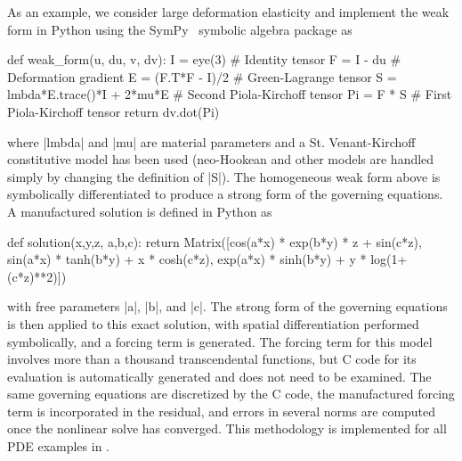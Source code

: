 As an example, we consider large deformation elasticity and implement the weak form in Python using the SymPy~\citep{sympy-web-page} symbolic algebra package as
\begin{pythoncode}
  def weak_form(u, du, v, dv):
    I = eye(3)                      # Identity tensor
    F = I - du                      # Deformation gradient
    E = (F.T*F - I)/2               # Green-Lagrange tensor
    S = lmbda*E.trace()*I + 2*mu*E  # Second Piola-Kirchoff tensor
    Pi = F * S                      # First Piola-Kirchoff tensor
    return dv.dot(Pi)
\end{pythoncode}
where \pyverb|lmbda| and \pyverb|mu| are material parameters and a St. Venant-Kirchoff constitutive model has been used (neo-Hookean and other models are handled simply by changing the definition of \pyverb|S|).
The homogeneous weak form above is symbolically differentiated to produce a strong form of the governing equations.
A manufactured solution is defined in Python as
\begin{pythoncode}
  def solution(x,y,z, a,b,c):
    return Matrix([cos(a*x) * exp(b*y) * z + sin(c*z),
                   sin(a*x) * tanh(b*y) + x * cosh(c*z),
                   exp(a*x) * sinh(b*y) + y * log(1+(c*z)**2)])
\end{pythoncode}
with free parameters \pyverb|a|, \pyverb|b|, and \pyverb|c|.
The strong form of the governing equations is then applied to this exact solution, with spatial differentiation performed symbolically, and a forcing term is generated.
The forcing term for this model involves more than a thousand transcendental functions, but C code for its evaluation is automatically generated and does not need to be examined.
The same governing equations are discretized by the C code, the manufactured forcing term is incorporated in the residual, and errors in several norms are computed once the nonlinear solve has converged.
This methodology is implemented for all PDE examples in {\Dohp}.

